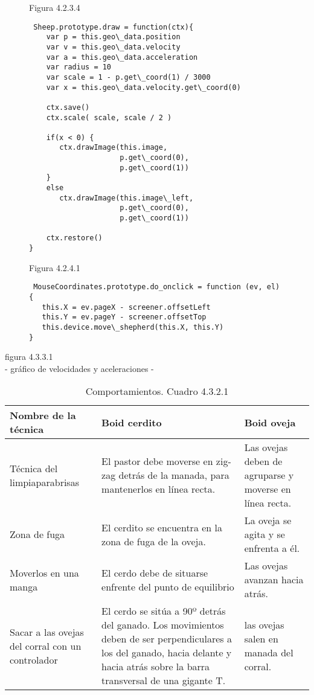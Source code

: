 \begin{figure}
Figura 4.2.3.4
\begin{verbatim}
 Sheep.prototype.draw = function(ctx){
    var p = this.geo\_data.position
    var v = this.geo\_data.velocity
    var a = this.geo\_data.acceleration
    var radius = 10
    var scale = 1 - p.get\_coord(1) / 3000
    var x = this.geo\_data.velocity.get\_coord(0)

    ctx.save()
    ctx.scale( scale, scale / 2 )

    if(x < 0) {
       ctx.drawImage(this.image, 
                     p.get\_coord(0),
                     p.get\_coord(1))
    }
    else
       ctx.drawImage(this.image\_left, 
                     p.get\_coord(0),
                     p.get\_coord(1))

    ctx.restore()
}
\end{verbatim}
\end{figure}


\begin{figure}
Figura 4.2.4.1
\begin{verbatim}
 MouseCoordinates.prototype.do_onclick = function (ev, el) {
   this.X = ev.pageX - screener.offsetLeft
   this.Y = ev.pageY - screener.offsetTop
   this.device.move\_shepherd(this.X, this.Y)
}
\end{verbatim}
\end{figure}


 
figura 4.3.3.1\\
- gráfico de velocidades y aceleraciones -\\


\begin{table}
\caption{Comportamientos. Cuadro 4.3.2.1}
\begin{tabular}{| p{4cm} | p{7cm} | p{4cm} |} %

\hline\hline %
Nombre de la técnica & Boid cerdito & Boid oveja \\ [0.5ex] %
\hline %
Técnica del limpiaparabrisas & El pastor debe moverse en zig-zag detrás de la manada, para mantenerlos en línea recta. & Las ovejas deben de agruparse y moverse en línea recta.\\
Zona de fuga & El cerdito se encuentra en la zona de fuga de la oveja. & La oveja se agita y se enfrenta a él. \\
Moverlos en una manga & El cerdo debe de situarse enfrente del punto de equilibrio & Las ovejas avanzan hacia atrás. \\
Sacar a las ovejas del corral con un controlador & El cerdo se sitúa  a 90º detrás del ganado. Los movimientos deben de ser perpendiculares a los del ganado, hacia delante y hacia atrás sobre la barra transversal de una gigante T. & las ovejas salen en 
manada del corral. \\ [1ex] %
\hline %
\end{tabular}
\label{table:nonlin} %
\end{table}

